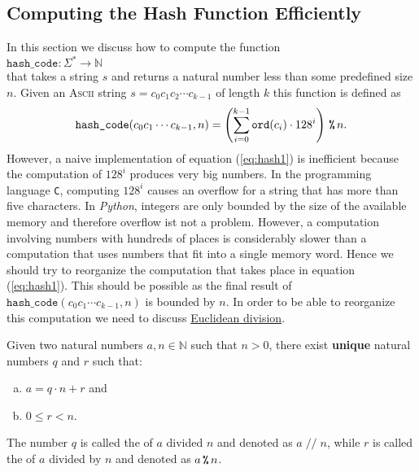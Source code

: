 \subsection{Computing the Hash Function Efficiently}
In this section we discuss how to compute the function 
\\[0.2cm]
\hspace*{1.3cm}
$\texttt{hash\_code}:\Sigma^* \rightarrow \mathbb{N}$
\\[0.2cm]
that takes a string $s$ and returns a natural number less than some predefined size $n$.
Given an \textsc{Ascii} string $s = c_0 c_1 c_2 \cdots c_{k-1}$ of length $k$ this function is defined as
\begin{equation}
  \texttt{hash\_code}(c_0c_1\cdots c_{k-1}, n) = \left(\sum\limits_{i=0}^{k-1} \texttt{ord}(c_i) \cdot 128^i\right) \,\texttt{\%}\, n.
  \label{eq:hash1}
\end{equation}
However, a naive implementation of equation (\ref{eq:hash1}) is inefficient because the computation of $128^i$
produces very big numbers.  In the programming language \texttt{C}, computing $128^i$ causes an overflow for a
string that has more than five characters.  In \textsl{Python}, integers are only bounded by the size of the
available memory and therefore overflow ist not a problem.  However, a computation
involving numbers with hundreds of places is considerably slower than a computation that uses numbers that fit
into a single memory word. Hence we should try to reorganize the computation that takes place in equation
(\ref{eq:hash1}).  This should be possible as the final result of $\texttt{hash\_code}(c_0c_1\cdots c_{k-1}, n)$
is bounded by $n$.  In order to be able to reorganize this computation we need to discuss
\href{https://en.wikipedia.org/wiki/Euclidean_division}{Euclidean division}.

\begin{Theorem}
  Given two natural numbers $a, n \in \mathbb{N}$ such that $n > 0$, there exist \textbf{unique} natural numbers 
  $q$ and $r$ such that:
  \begin{enumerate}[(a)]
  \item $a = q \cdot n + r$ \quad and
  \item $0 \leq r < n$.
  \end{enumerate}
  The number $q$ is called the  of $a$ divided $n$ and denoted as $a \;\texttt{//}\; n$, while
  $r$ is called the  of $a$ divided by $n$ and denoted as $a \,\texttt{\%}\, n$.  \eox
\end{Theorem}

